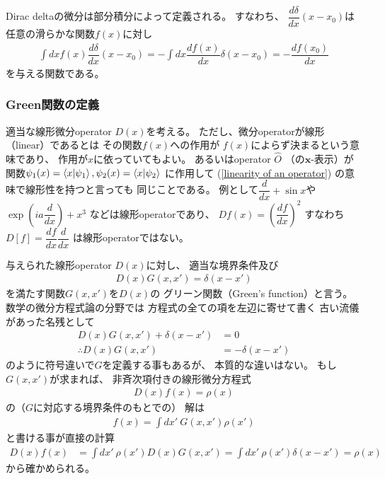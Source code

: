 Dirac deltaの微分は部分積分によって定義される。
すなわち、
$\dfrac{d \delta}{dx}
    (x - x_0)$は
任意の滑らかな関数$f(x)$に対し
\begin{align}
    \int dx
    f(x)
    \dfrac{d \delta}{dx}
    (x - x_0)
=
    -
    \int dx
    \dfrac{d f(x)}{dx}
    \delta(x - x_0)
=
    -
    \dfrac{d f(x_0)}{dx}
\end{align}
を与える関数である。

\subsubsection{Green関数の定義}

適当な線形微分operator $D(x)$を考える。
ただし、微分operatorが線形（linear）であるとは
その関数$f(x)$への作用が
$f(x)$によらず決まるという意味であり、
作用が$x$に依っていてもよい。
あるいはoperator $\hat{O}$
（の$\bm{x}$-表示）が
関数$\psi_1(x) = \braket{x | \psi_1},
\psi_2(x) = \braket{x | \psi_2}$
に作用して
(\ref{linearity of an operator})
の意味で線形性を持つと言っても
同じことである。
例として$\dfrac{d}{dx} + \sin x$や
$\exp( i a \dfrac{d}{dx}) + x^3$
などは線形operatorであり、
$D f(x) = \left(
    \dfrac{d f}{dx}
\right)^2$
すなわち$D[f] = \dfrac{d f}{dx}
    \dfrac{d}{dx}$
は線形operatorではない。

与えられた線形operator $D(x)$に対し、
適当な境界条件及び
\begin{align}
    D(x) G(x, x')
    =
    \delta(x - x')
\end{align}
を満たす関数$G(x, x')$を$D(x)$の
グリーン関数（Green's function）と言う。
数学の微分方程式論の分野では
方程式の全ての項を左辺に寄せて書く
古い流儀があった名残として
\begin{align*}
    D(x) G(x, x')
    +
    \delta(x - x')
&=
    0
\\\therefore
    D(x) G(x, x')
&=
    -
    \delta(x - x')
\end{align*}
のように符号違いで$G$を定義する事もあるが、
本質的な違いはない。
もし$G(x, x')$が求まれば、
非斉次項付きの線形微分方程式
\begin{align}
    D(x) f(x)
    =
    \rho(x)
\end{align}
の（$G$に対応する境界条件のもとでの）
解は
\begin{align}
    f(x) =
    \int dx'\ 
        G(x, x')
        \rho(x')
\end{align}
と書ける事が直接の計算
\begin{align}
    D(x) f(x)
&=
    \int dx'\ 
        \rho(x')
    D(x)
        G(x, x')
=
    \int dx'\ 
        \rho(x')
    \delta (x - x')
=
    \rho(x)
\end{align}
から確かめられる。

